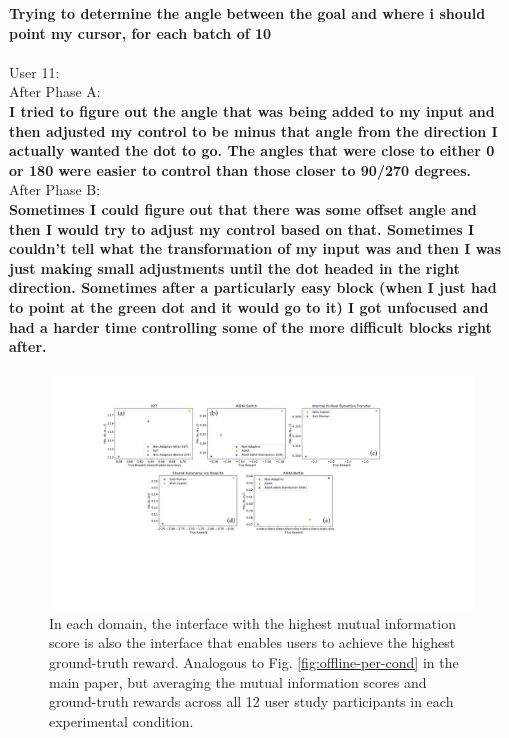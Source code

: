 \documentclass{article}
\begin{document}
\begin{displayquote}
\textbf{Trying to determine the angle between the goal and where i should point my cursor, for each batch of 10} \\
\\
User 11: \\
After Phase A: \\
\textbf{I tried to figure out the angle that was being added to my input and then adjusted my control to be minus that angle from the direction I actually wanted the dot to go. The angles that were close to either 0 or 180 were easier to control than those closer to 90/270 degrees.} \\
After Phase B: \\
\textbf{Sometimes I could figure out that there was some offset angle and then I would try to adjust my control based on that. Sometimes I couldn't tell what the transformation of my input was and then I was just making small adjustments until the dot headed in the right direction. Sometimes after a particularly easy block (when I just had to point at the green dot and it would go to it) I got unfocused and had a harder time controlling some of the more difficult blocks right after.}
\end{displayquote}

\begin{figure}[t]
    \centering
    \includegraphics[width=\linewidth]{offline-per-pol.pdf}
    \caption{In each domain, the interface with the highest mutual information score is also the interface that enables users to achieve the highest ground-truth reward. Analogous to Fig. \ref{fig:offline-per-cond} in the main paper, but averaging the mutual information scores and ground-truth rewards across all 12 user study participants in each experimental condition.}
    \label{fig:offline-per-pol}
\end{figure}
\end{document}
